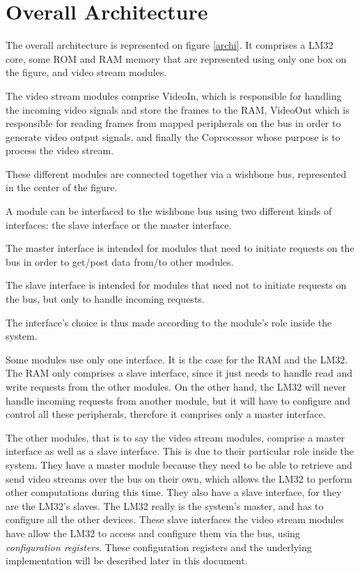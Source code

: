 
\section{Overall Architecture}

The overall architecture is represented on figure \ref{archi}.
It comprises a LM32 core, some ROM and RAM memory that are represented using only one box on the figure, and video stream modules.

The video stream modules comprise VideoIn, which is responsible for handling the incoming video signals and store the frames to the RAM, VideoOut which is responsible for reading frames from mapped peripherals on the bus in order to generate video output signals, and finally the Coprocessor whose purpose is to process the video stream.

These different modules are connected together via a wishbone bus, represented in the center of the figure.

A module can be interfaced to the wishbone bus using two different kinds of interfaces: the slave interface or the master interface.

The master interface is intended for modules that need to initiate requests on the bus in order to get/post data from/to other modules.

The slave interface is intended for modules that need not to initiate requests on the bus, but only to handle incoming requests.

The interface's choice is thus made according to the module's role inside the system.

Some modules use only one interface. It is the case for the RAM and the LM32. The RAM only comprises a slave interface, since it just needs to handle read and write requests from the other modules.
On the other hand, the LM32 will never handle incoming requests from another module, but it will have to configure and control all these peripherals, therefore it comprises only a master interface.

The other modules, that is to say the video stream modules, comprise a master interface as well as a slave interface.
This is due to their particular role inside the system. They have a master module because they need to be able to retrieve and send video streams over the bus on their own, which allows the LM32 to perform other computations during this time.
They also have a slave interface, for they are the LM32's slaves. The LM32 really is the system's master, and has to configure all the other devices.
These slave interfaces the video stream modules have allow the LM32 to access and configure them via the bus, using \emph{configuration registers}.
These configuration registers and the underlying implementation will be described later in this document.

